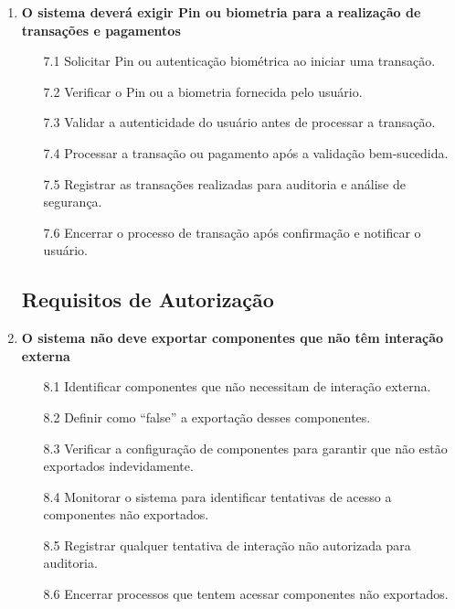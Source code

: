 \begin{enumerate}
        \item \textbf{O sistema deverá exigir Pin ou biometria para a realização de transações e pagamentos}
        \begin{enumerate}
            \item[7.1] Solicitar Pin ou autenticação biométrica ao iniciar uma transação.
            \item[7.2] Verificar o Pin ou a biometria fornecida pelo usuário.
            \item[7.3] Validar a autenticidade do usuário antes de processar a transação.
            \item[7.4] Processar a transação ou pagamento após a validação bem-sucedida.
            \item[7.5] Registrar as transações realizadas para auditoria e análise de segurança.
            \item[7.6] Encerrar o processo de transação após confirmação e notificar o usuário.
        \end{enumerate}
    
        \subsection{Requisitos de Autorização}
    
        \item \textbf{O sistema não deve exportar componentes que não têm interação externa}
        \begin{enumerate}
            \item[8.1] Identificar componentes que não necessitam de interação externa.
            \item[8.2] Definir como ``false'' a exportação desses componentes.
            \item[8.3] Verificar a configuração de componentes para garantir que não estão exportados indevidamente.
            \item[8.4] Monitorar o sistema para identificar tentativas de acesso a componentes não exportados.
            \item[8.5] Registrar qualquer tentativa de interação não autorizada para auditoria.
            \item[8.6] Encerrar processos que tentem acessar componentes não exportados.
        \end{enumerate}
    

\end{enumerate}
